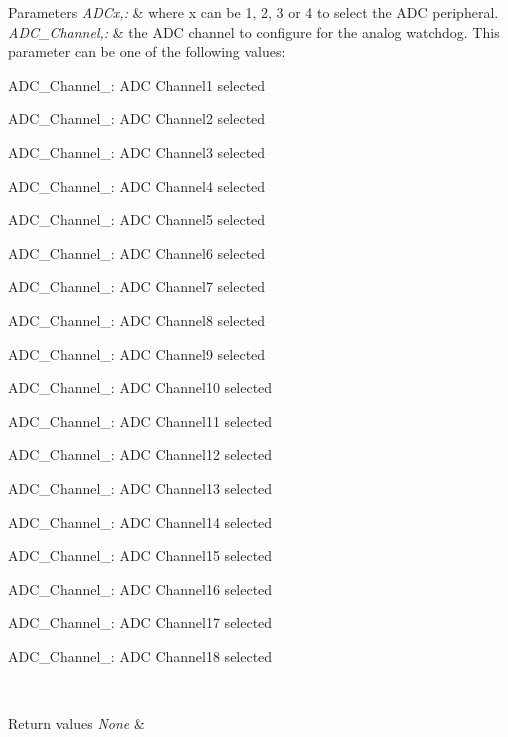 \begin{DoxyParams}{Parameters}
{\em A\-D\-Cx,\-:} & where x can be 1, 2, 3 or 4 to select the A\-D\-C peripheral. \\
\hline
{\em A\-D\-C\-\_\-\-Channel,\-:} & the A\-D\-C channel to configure for the analog watchdog. This parameter can be one of the following values\-: \begin{DoxyItemize}
\item A\-D\-C\-\_\-\-Channel\-\_\-: A\-D\-C Channel1 selected \item A\-D\-C\-\_\-\-Channel\-\_\-: A\-D\-C Channel2 selected \item A\-D\-C\-\_\-\-Channel\-\_\-: A\-D\-C Channel3 selected \item A\-D\-C\-\_\-\-Channel\-\_\-: A\-D\-C Channel4 selected \item A\-D\-C\-\_\-\-Channel\-\_\-: A\-D\-C Channel5 selected \item A\-D\-C\-\_\-\-Channel\-\_\-: A\-D\-C Channel6 selected \item A\-D\-C\-\_\-\-Channel\-\_\-: A\-D\-C Channel7 selected \item A\-D\-C\-\_\-\-Channel\-\_\-: A\-D\-C Channel8 selected \item A\-D\-C\-\_\-\-Channel\-\_\-: A\-D\-C Channel9 selected \item A\-D\-C\-\_\-\-Channel\-\_\-: A\-D\-C Channel10 selected \item A\-D\-C\-\_\-\-Channel\-\_\-: A\-D\-C Channel11 selected \item A\-D\-C\-\_\-\-Channel\-\_\-: A\-D\-C Channel12 selected \item A\-D\-C\-\_\-\-Channel\-\_\-: A\-D\-C Channel13 selected \item A\-D\-C\-\_\-\-Channel\-\_\-: A\-D\-C Channel14 selected \item A\-D\-C\-\_\-\-Channel\-\_\-: A\-D\-C Channel15 selected \item A\-D\-C\-\_\-\-Channel\-\_\-: A\-D\-C Channel16 selected \item A\-D\-C\-\_\-\-Channel\-\_\-: A\-D\-C Channel17 selected \item A\-D\-C\-\_\-\-Channel\-\_\-: A\-D\-C Channel18 selected \end{DoxyItemize}
\\
\hline
\end{DoxyParams}

\begin{DoxyRetVals}{Return values}
{\em None} & \\
\hline
\end{DoxyRetVals}



